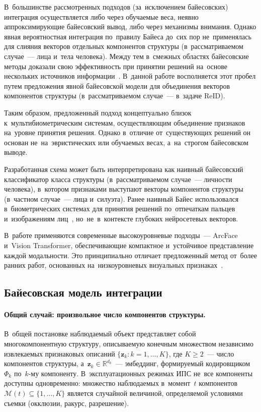 В~большинстве рассмотренных подходов (за~исключением байесовских)
интеграция осуществляется либо через обучаемые веса, неявно
аппроксимирующие байесовский вывод, либо через механизмы
внимания. Однако явная вероятностная интеграция по~правилу Байеса
до~сих пор не~применялась для слияния векторов отдельных компонентов
структуры (в~рассматриваемом случае~--- лица и~тела человека). Между тем
в~смежных областях байесовские методы доказали свою эффективность при
принятии решений на~основе нескольких источников
информации~\cite{Koo2018multimodal}. В~данной работе восполняется этот
пробел путем предложения явной байесовской модели для объединения
векторов компонентов структуры (в~рассматриваемом случае~--- в~задаче ReID).

Таким образом, предложенный подход концептуально близок
к~мультибиометрическим системам, осуществляющим объединение признаков
на~уровне принятия решения. Однако в~отличие от~существующих решений
он основан не~на~эвристических или обучаемых весах, а~на~строгом
байесовском выводе.

Разработанная схема может быть интерпретирована как наивный
байесовский классификатор класса структуры (в~рассматриваемом
случае~--- личности человека), в~котором признаками выступают
векторы компонентов структуры (в~частном случае~--- лица и~силуэта). Ранее наивный Байес использовался
в~биометрических системах для принятия решений по~отпечаткам пальцев
и~изображениям лиц~\cite{Koo2018multimodal}, но~не~в~контексте
глубоких нейросетевых векторов.

В~работе применяются современные
высокоуровневые подходы~--- ArcFace и~Vision Transformer,
обеспечивающие компактное и~устойчивое представление каждой
модальности. Это принципиально отличает предложенный метод от~более
ранних работ, основанных на~низкоуровневых визуальных
признаках~\cite{Khachumov2015face}.

\subsection{Байесовская модель интеграции}\label{sec:ch2/bayes-model}

\paragraph{Общий случай: произвольное число компонентов структуры.}
В~общей постановке наблюдаемый объект представляет собой
многокомпонентную структуру, описываемую конечным множеством
независимо извлекаемых признаковых описаний
$\{\mathbf{z}_k\colon k=1,\ldots,K\}$, где $K\ge 2$~--- число
компонентов структуры, а~$\mathbf{z}_k\in\mathbb{R}^{d_k}$~---
эмбеддинг, формируемый кодировщиком~$\Phi_k$ по~$k$-му компоненту.
В~эксплуатационных режимах ИПС не~все компоненты доступны
одновременно: множество наблюдаемых в~момент~$t$ компонентов
$\mathcal{M}(t)\subseteq\{1,\ldots,K\}$ является случайной величиной,
определяемой условиями съемки (окклюзии, ракурс, разрешение).


